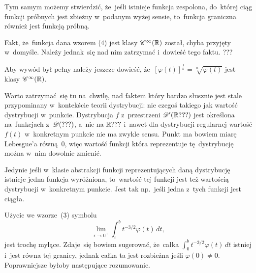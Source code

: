 \documentclass[a4paper,11pt]{article}
\numberwithin{equation}{section}
\begin{document}
Tym samym możemy stwierdzić, że~jeśli istnieje funkcja zespolona,
do~której ciąg funkcji próbnych jest zbieżny w~podanym wyżej sensie,
to~funkcja graniczna również jest funkcją próbną.

\VerSpaceFour





\noindent
{} Fakt, że~funkcja dana wzorem (4) jest klasy
$\mathcal{C}^{ \infty }( \mathbb{R} )$ został, chyba przyjęty w~domyśle. Należy jednak~się
nad nim zatrzymać i~dowieść tego faktu. ???

\VerSpaceFour





\noindent
{} Aby wywód był pełny należy jeszcze dowieść,
że~$[ \varphi( t ) ]^{ \frac{ 1 }{ n } } = \sqrt[ n ]{ \varphi( t ) }$ jest
klasy $\mathcal{C}^{ \infty }( \mathbb{R} )$.

\VerSpaceFour





\noindent
{} Warto zatrzymać~się tu na~chwilę, nad faktem który
bardzo słusznie jest stale przypominany w~kontekście teorii
dystrybucji: nie czegoś takiego jak wartość dystrybucji w~punkcie.
Dystrybucja $f$ z~przestrzeni $\mathcal{D}'( \mathbb{R} ??? )$ jest określona
na~funkcjach z~$\mathcal{D}( ??? )$, a~nie na $\mathbb{R} ???$ i~nawet dla dystrybucji
regularnej wartość $f( t )$ w~konkretnym punkcie nie ma zwykle sensu.
Punkt ma bowiem miarę Lebesgue’a równą~0, więc wartość funkcji która
reprezentuje tę~dystrybucję można w~nim dowolnie zmienić.

Jedynie jeśli w~klasie abstrakcji funkcji reprezentujących daną
dystrybucję istnieje jedna funkcja wyróżniona, to~wartość tej funkcji
jest też wartością dystrybucji w~konkretnym punkcie. Jest tak
np.~jeśli jedna z~tych funkcji jest ciągła.

\VerSpaceFour





\noindent
{} Użycie we wzorze~(3) symbolu
\begin{equation}
  \label{eq:Zemanian-01}
  \lim_{ \epsilon \to 0^{ + } } \int_{ \epsilon }^{ b } t^{ -3 / 2 } \varphi( t ) \, dt,
\end{equation}
jest trochę mylące. Zdaje~się bowiem sugerować, że~całka
$\int_{ 0 }^{ b } t^{ -3 / 2 } \varphi( t ) \, dt$ istniej i~jest równa tej
granicy, jednak całka ta jest rozbieżna jeśli $\varphi( 0 ) \neq 0$.
Poprawniejsze byłoby następujące rozumowanie.
\end{document}

